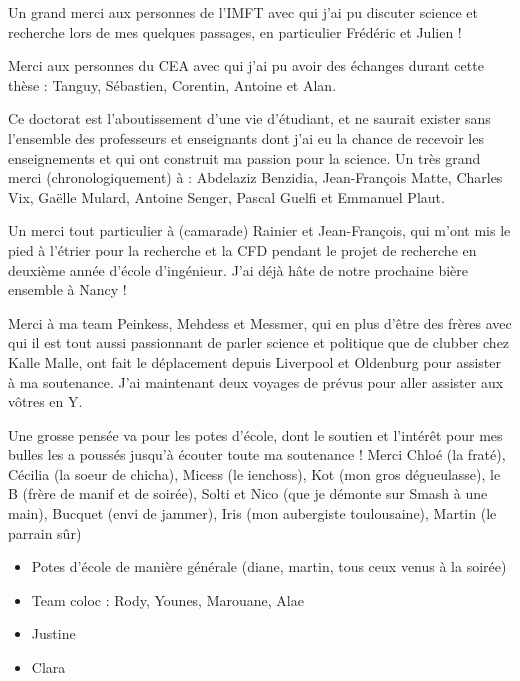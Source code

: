 Un grand merci aux personnes de l'IMFT avec qui j'ai pu discuter science et recherche lors de mes quelques passages, en particulier Frédéric et Julien ! 

\npar

Merci aux personnes du CEA avec qui j'ai pu avoir des échanges durant cette thèse : Tanguy, Sébastien, Corentin, Antoine et Alan.

\npar




Ce doctorat est l'aboutissement d'une vie d'étudiant, et ne saurait exister sans l'ensemble des professeurs et enseignants dont j'ai eu la chance de recevoir les enseignements et qui ont construit ma passion pour la science. Un très grand merci (chronologiquement) à : Abdelaziz Benzidia, Jean-François Matte, Charles Vix, Gaëlle Mulard, Antoine Senger, Pascal Guelfi et Emmanuel Plaut. 

\npar

Un merci tout particulier à (camarade) Rainier et Jean-François, qui m'ont mis le pied à l'étrier pour la recherche et la CFD pendant le projet de recherche en deuxième année d'école d'ingénieur. J'ai déjà hâte de notre prochaine bière ensemble à Nancy !


\npar

Merci à ma team Peinkess, Mehdess et Messmer, qui en plus d'être des frères avec qui il est tout aussi passionnant de parler science et politique que de clubber chez Kalle Malle, ont fait le déplacement depuis Liverpool et Oldenburg pour assister à ma soutenance. J'ai maintenant deux voyages de prévus pour aller assister aux vôtres en Y.

\npar

Une grosse pensée va pour les potes d'école, dont le soutien et l'intérêt pour mes bulles les a poussés jusqu'à écouter toute ma soutenance ! Merci Chloé (la fraté), Cécilia (la soeur de chicha), Micess (le ienchoss), Kot (mon gros dégueulasse), le B (frère de manif et de soirée),  Solti et Nico (que je démonte sur Smash à une main), Bucquet (envi de jammer), Iris (mon aubergiste toulousaine), Martin (le parrain sûr)
\begin{itemize}
\item Potes d'école de manière générale (diane, martin, tous ceux venus à la soirée)
\item Team coloc : Rody, Younes, Marouane, Alae
\item Justine
\item Clara
\end{itemize}


